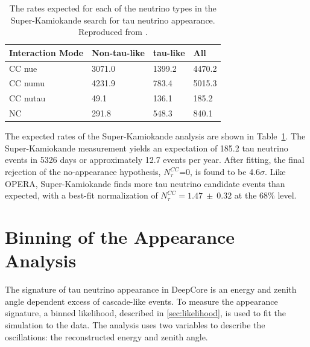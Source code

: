 \begin{table}[]
\centering
\begin{tabular}{@{}llll@{}}
\toprule
Interaction Mode & Non-tau-like & tau-like & All    \\ \midrule
CC nue       & 3071.0          & 1399.2      & 4470.2 \\
CC numu     & 4231.9          & 783.4       & 5015.3 \\
CC nutau    & 49.1            & 136.1       & 185.2  \\
NC               & 291.8           & 548.3       & 840.1  \\ \bottomrule
\end{tabular}
\caption[The rates expected for each of the neutrino types in the Super-Kamiokande search for tau neutrino appearance]{The rates expected for each of the neutrino types in the Super-Kamiokande search for tau neutrino appearance. Reproduced from \cite{SuperK-Tau2017}.}
\label{tab:superk_appearance_rates}
\end{table}

The expected rates of the Super-Kamiokande analysis are shown in Table~\ref{tab:superk_appearance_rates}.
The Super-Kamiokande measurement yields an expectation of 185.2 tau neutrino events in 5326 days or approximately 12.7 events per year.
After fitting, the final rejection of the no-appearance hypothesis, $N^{CC}_\tau$=0, is found to be 4.6$\sigma$.
Like OPERA, Super-Kamiokande finds more tau neutrino candidate events than expected, with a best-fit normalization of $N^{CC}_\tau=1.47~\pm~0.32$ at the 68\% level.





















\label{sec:binning}
\section{Binning of the Appearance Analysis}
The signature of tau neutrino appearance in DeepCore is an energy and zenith angle dependent excess of cascade-like events. 
To measure the appearance signature, a binned likelihood, described in \ref{sec:likelihood}, is used to fit the simulation to the data.
The analysis uses two variables to describe the oscillations: the reconstructed energy and zenith angle.

